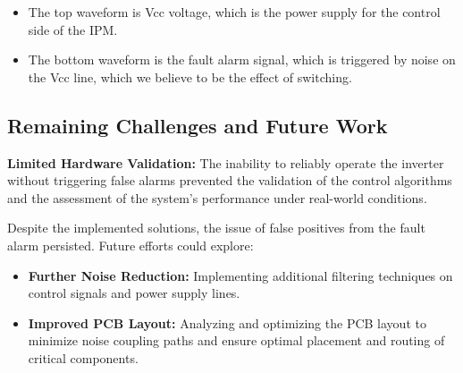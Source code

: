 \begin{itemize}
	\item The top waveform is Vcc voltage, which is the power supply for the control side of the IPM.
	\item The bottom waveform is the fault alarm signal, which is triggered by noise on the Vcc line, which we believe to be the effect of switching.
\end{itemize}




\subsection*{Remaining Challenges and Future Work}

\textbf{Limited Hardware Validation:} The inability to reliably operate the inverter without triggering false alarms prevented the validation of the control algorithms and the assessment of the system's performance under real-world conditions.


Despite the implemented solutions, the issue of false positives from the fault alarm persisted. Future efforts could explore:



\begin{itemize}
	\item \textbf{Further Noise Reduction:} Implementing additional filtering techniques on control signals and power supply lines.
	\item \textbf{Improved PCB Layout:} Analyzing and optimizing the PCB layout to minimize noise coupling paths and ensure optimal placement and routing of critical components.
\end{itemize}




\newpage